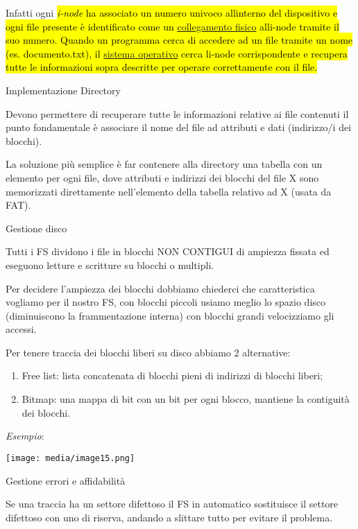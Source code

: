 Infatti ogni \hl{\emph{i-node} ha associato un numero univoco
all\textquotesingle interno del dispositivo e ogni file presente è
identificato come un
\href{https://it.wikipedia.org/wiki/Collegamento_fisico}{collegamento
fisico} all\textquotesingle i-node tramite il suo numero. Quando un
programma cerca di accedere ad un file tramite un nome (es.
documento.txt), il
\href{https://it.wikipedia.org/wiki/Sistema_operativo}{sistema
operativo} cerca l\textquotesingle i-node corrispondente e recupera
tutte le informazioni sopra descritte per operare correttamente con il
file.}

Implementazione Directory

Devono permettere di recuperare tutte le informazioni relative ai file
contenuti il punto fondamentale è associare il nome del file ad
attributi e dati (indirizzo/i dei blocchi).

La soluzione più semplice è far contenere alla directory una tabella con
un elemento per ogni file, dove attributi e indirizzi dei blocchi del
file X sono memorizzati direttamente nell'elemento della tabella
relativo ad X (usata da FAT).

Gestione disco

Tutti i FS dividono i file in blocchi NON CONTIGUI di ampiezza fissata
ed eseguono letture e scritture su blocchi o multipli.

Per decidere l'ampiezza dei blocchi dobbiamo chiederci che
caratteristica vogliamo per il nostro FS, con blocchi piccoli usiamo
meglio lo spazio disco (diminuiscono la frammentazione interna) con
blocchi grandi velocizziamo gli accessi.

Per tenere traccia dei blocchi liberi su disco abbiamo 2 alternative:

\begin{enumerate}
\def\labelenumi{\arabic{enumi}.}
\item
  Free list: lista concatenata di blocchi pieni di indirizzi di blocchi
  liberi;
\item
  Bitmap: una mappa di bit con un bit per ogni blocco, mantiene la
  contiguità dei blocchi.
\end{enumerate}

\emph{Esempio}:

\texttt{[image: media/image15.png]}

Gestione errori e affidabilità

Se una traccia ha un settore difettoso il FS in automatico sostituisce
il settore difettoso con uno di riserva, andando a slittare tutto per
evitare il problema.

